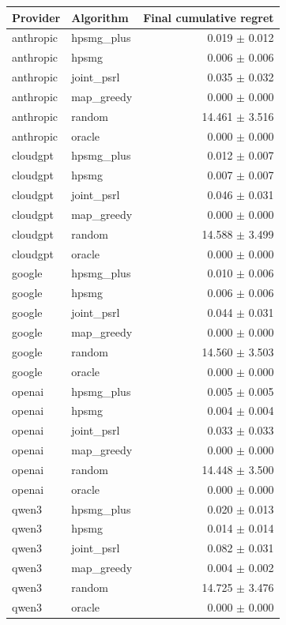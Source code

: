 \begin{tabular}{llr}
Provider & Algorithm & Final cumulative regret \\
\hline
anthropic & hpsmg_plus & 0.019 $\pm$ 0.012 \\
anthropic & hpsmg & 0.006 $\pm$ 0.006 \\
anthropic & joint_psrl & 0.035 $\pm$ 0.032 \\
anthropic & map_greedy & 0.000 $\pm$ 0.000 \\
anthropic & random & 14.461 $\pm$ 3.516 \\
anthropic & oracle & 0.000 $\pm$ 0.000 \\
cloudgpt & hpsmg_plus & 0.012 $\pm$ 0.007 \\
cloudgpt & hpsmg & 0.007 $\pm$ 0.007 \\
cloudgpt & joint_psrl & 0.046 $\pm$ 0.031 \\
cloudgpt & map_greedy & 0.000 $\pm$ 0.000 \\
cloudgpt & random & 14.588 $\pm$ 3.499 \\
cloudgpt & oracle & 0.000 $\pm$ 0.000 \\
google & hpsmg_plus & 0.010 $\pm$ 0.006 \\
google & hpsmg & 0.006 $\pm$ 0.006 \\
google & joint_psrl & 0.044 $\pm$ 0.031 \\
google & map_greedy & 0.000 $\pm$ 0.000 \\
google & random & 14.560 $\pm$ 3.503 \\
google & oracle & 0.000 $\pm$ 0.000 \\
openai & hpsmg_plus & 0.005 $\pm$ 0.005 \\
openai & hpsmg & 0.004 $\pm$ 0.004 \\
openai & joint_psrl & 0.033 $\pm$ 0.033 \\
openai & map_greedy & 0.000 $\pm$ 0.000 \\
openai & random & 14.448 $\pm$ 3.500 \\
openai & oracle & 0.000 $\pm$ 0.000 \\
qwen3 & hpsmg_plus & 0.020 $\pm$ 0.013 \\
qwen3 & hpsmg & 0.014 $\pm$ 0.014 \\
qwen3 & joint_psrl & 0.082 $\pm$ 0.031 \\
qwen3 & map_greedy & 0.004 $\pm$ 0.002 \\
qwen3 & random & 14.725 $\pm$ 3.476 \\
qwen3 & oracle & 0.000 $\pm$ 0.000 \\
\end{tabular}
